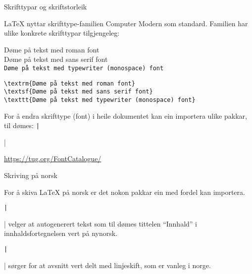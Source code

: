 	\begin{frame}[containsverbatim]{Skrifttypar og skriftstorleik}
	
\LaTeX{} nyttar skrifttype-familien Computer Modern som standard. Familien har ulike konkrete skrifttypar tilgjengeleg:
	
\textrm{Døme på tekst med roman font}\\
\textsf{Døme på tekst med sans serif font}\\
\texttt{Døme på tekst med typewriter (monospace) font}

	\begin{verbatim}
\textrm{Døme på tekst med roman font}
\textsf{Døme på tekst med sans serif font}
\texttt{Døme på tekst med typewriter (monospace) font}
	\end{verbatim}
	
	For å endra skrifttype (font) i heile dokumentet kan ein importera ulike pakkar, til dømes: \texttt|\usepackage{tgbonum}|
	
	\url{https://tug.org/FontCatalogue/}
	
	
\end{frame}

\begin{frame}{Skriving på norsk}
	
	For å skiva \LaTeX{} på norsk er det nokon pakkar ein med fordel kan importera.
	
	\texttt|\usepackage[nynorsk]{babel}| velger at autogenerert tekst som til dømes tittelen ``Innhald'' i innhaldsfortegnelsen vert på nynorsk.
	
	\texttt|\usepackage{parskip}| sørger for at avsnitt vert delt med linjeskift, som er vanleg i norge.
	
\end{frame}

